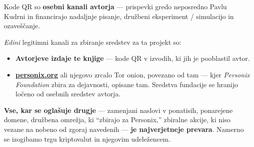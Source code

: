 \begin{minipage}[t]{0.60\textwidth}
\vspace{0pt}
\begin{mdframed}[
  linewidth=0.7pt,roundcorner=5pt,
  innerleftmargin=10pt,innerrightmargin=10pt,
  innertopmargin=8pt,innerbottommargin=8pt,
  skipabove=0pt,skipbelow=0pt,
  linecolor=cbwarning!50,backgroundcolor=cbwarning!5,
  nobreak=true,
  needspace=4\baselineskip,
]
\footnotesize
Kode QR so \textbf{osebni kanali avtorja} --- prispevki gredo neposredno Pavlu Kudrni in financirajo nadaljnje pisanje, družbeni eksperiment / simulacijo in ozaveščanje.

\smallskip
\emph{Edini} legitimni kanali za zbiranje sredstev za ta projekt so:

\smallskip
\begin{itemize}
\setlength{\itemsep}{0pt}
\setlength{\topsep}{0pt}
\item \textbf{Avtorjeve izdaje te knjige} --- kode QR v izvodih, ki jih je pooblastil avtor.
\item \href{https://personix.org}{\textbf{personix.org}} ali njegovo zrcalo Tor onion, povezano od tam --- kjer \emph{Personix Foundation} zbira za dejavnosti, opisane tam. Sredstva fundacije se hranijo ločeno od osebnih sredstev avtorja.
\end{itemize}

\smallskip
\textbf{Vse, kar se oglašuje drugje} --- zamenjani naslovi v ponatisih, ponarejene domene, družbena omrežja, ki ``zbirajo za Personix,'' zbiralne akcije, ki niso vezane na nobeno od zgoraj navedenih --- \textbf{je najverjetneje prevara}. Namerno se izogibamo trgu kriptovalut in njegovim udeležencem.
\end{mdframed}
\end{minipage}

\clearpage
